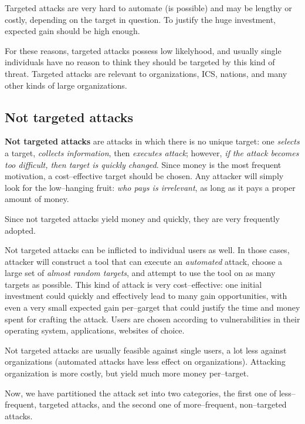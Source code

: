 \documentclass[10pt]{\classname}
\begin{document}
Targeted attacks are very hard to automate (is possible) and may be lengthy or
costly, depending on the target in question. To justify the huge investment,
expected gain should be high enough.

For these reasons, targeted attacks possess low likelyhood, and usually single
individuals have no reason to think they should be targeted by this kind of
threat. Targeted attacks are relevant to organizations, ICS, nations, and many
other kinds of large organizations.

\subsection{Not targeted attacks}

\textbf{Not targeted attacks} are attacks in which there is no unique target:
one \emph{selects} a target, \emph{collects information}, then \emph{executes
attack}; however, \emph{if the attack becomes too difficult, then target is
quickly changed}. Since money is the most frequent motivation, a
cost--effective target should be chosen. Any attacker will simply look for the
low--hanging fruit: \emph{who pays is irrelevant}, as long as it pays a proper
amount of money.

Since not targeted attacks yield money and quickly, they are very frequently
adopted.

Not targeted attacks can be inflicted to individual users as well.
In those cases, attacker will construct a tool that can execute an
\emph{automated} attack, choose a large set of \emph{almost random targets},
and attempt to use the tool on as many targets as possible. This kind of attack
is very cost--effective: one initial investment could quickly and effectively
lead to many gain opportunities, with even a very small expected gain
per--garget that could justify the time and money spent for crafting the
attack. Users are chosen according to vulnerabilities in their operating
system, applications, websites of choice.

Not targeted attacks are usually feasible against single users, a lot
less against organizations (automated attacks have less effect on
organizations). Attacking organization is more costly, but yield much more
money per--target.

\bigskip

Now, we have partitioned the attack set into two categories, the first one of
less--frequent, targeted attacks, and the second one of more--frequent,
non--targeted attacks.
\end{document}
